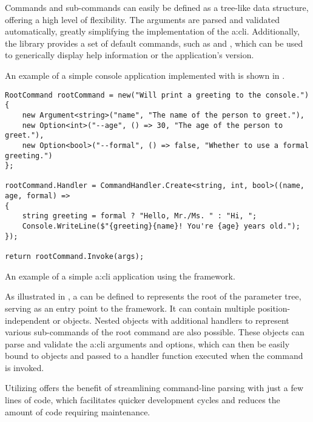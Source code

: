 Commands and sub-commands can easily be defined as a tree-like data structure, offering a high level of flexibility. The arguments are parsed and validated automatically, greatly simplifying the implementation of the \gls{a:cli}. Additionally, the library provides a set of default commands, such as  and , which can be used to generically display help information or the application's version. 

An example of a simple console application implemented with  is shown in .

\begin{listing}[H]
\begin{verbatim}
RootCommand rootCommand = new("Will print a greeting to the console.")
{
    new Argument<string>("name", "The name of the person to greet."),
    new Option<int>("--age", () => 30, "The age of the person to greet."),
    new Option<bool>("--formal", () => false, "Whether to use a formal greeting.")
};

rootCommand.Handler = CommandHandler.Create<string, int, bool>((name, age, formal) =>
{
    string greeting = formal ? "Hello, Mr./Ms. " : "Hi, ";
    Console.WriteLine($"{greeting}{name}! You're {age} years old.");
});

return rootCommand.Invoke(args);
\end{verbatim}
\caption{An example of a simple \gls{a:cli} application using the  framework.}
\label{lst:cli-example}
\end{listing}

As illustrated in , a  can be defined to represents the root of the parameter tree, serving as an entry point to the framework. It can contain multiple position-independent  or  objects. Nested  objects with additional handlers to represent various sub-commands of the root command are also possible. These objects can parse and validate the \gls{a:cli} arguments and options, which can then be easily bound to objects and passed to a handler function executed when the command is invoked.

Utilizing  offers the benefit of streamlining command-line parsing with just a few lines of code, which facilitates quicker development cycles and reduces the amount of code requiring maintenance.

